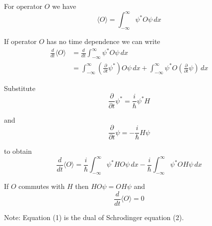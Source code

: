 


For operator $O$ we have
\begin{equation*}
\langle O\rangle=\int_{-\infty}^\infty\psi^*O\psi\,dx
\end{equation*}

If operator $O$ has no time dependence we can write
\begin{align*}
\frac{d}{dt}\langle O\rangle
&=\frac{d}{dt}\int_{-\infty}^\infty\psi^*O\psi\,dx
\\
&=\int_{-\infty}^\infty\left(\frac{\partial}{\partial t}\psi^*\right)O\psi\,dx
+\int_{-\infty}^\infty\psi^*O\left(\frac{\partial}{\partial t}\psi\right)\,dx
\end{align*}

Substitute
\begin{equation*}
\frac{\partial}{\partial t}\psi^*=\frac{i}{\hbar}\psi^*H
\tag{1}
\end{equation*}

and
\begin{equation*}
\frac{\partial}{\partial t}\psi=-\frac{i}{\hbar}H\psi
\tag{2}
\end{equation*}

to obtain
\begin{equation*}
\frac{d}{dt}\langle O\rangle
=\frac{i}{\hbar}\int_{-\infty}^\infty\psi^*HO\psi\,dx
-\frac{i}{\hbar}\int_{-\infty}^\infty\psi^*OH\psi\,dx
\end{equation*}

If $O$ commutes with $H$ then $HO\psi=OH\psi$ and
\begin{equation*}
\frac{d}{dt}\langle O\rangle=0
\end{equation*}

Note: Equation (1) is the dual of Schrodinger equation (2).


